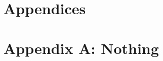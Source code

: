 \documentclass[letterpaper,11pt]{texMemo} %
\begin{document}
\section*{Appendices}

\newpage

\section*{Appendix A: Nothing}

\end{document}

